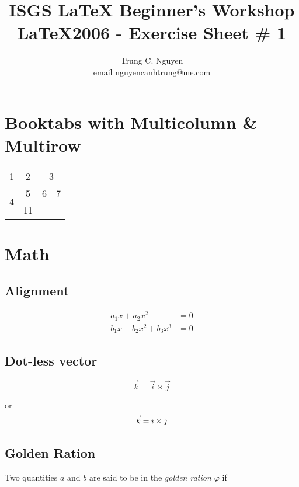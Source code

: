 \documentclass[a4paper, 10pt]{article}
\title{ISGS \LaTeX { }Beginner's Workshop 
	\\ \LaTeX 2006 - Exercise Sheet \# 1 }
\author{Trung C. Nguyen 
	\\ email \href{mailto:nguyencanhtrung@me.com}{nguyencanhtrung@me.com} }
\begin{document}
	\maketitle
	\tableofcontents
	
	\newpage
	
	\section{Booktabs with Multicolumn \& Multirow}
	\begin{tabular}{cccc}
		\toprule
		1 & 2 & \multicolumn{2}{c}{3} \\
		\multirow{2}{*}{4}& 5 & 6 & 7 \\
		10 & 11 & & \\
		
	\end{tabular}

	\section{Math}
	\subsection{Alignment}
	
	\begin{align}
		a_1x + a_2x^2 &= 0 \\
		b_1x +b_2x^2 + b_3x^3 &= 0
	\end{align}

	\subsection{Dot-less vector}
		$$\vec{k} = \vec{i} \times \vec{j} $$
		
		or
		\begin{align}
		\vec{k} = \imath \times \jmath \notag
		\end{align}
	\subsection{Golden Ration}
	Two quantities $a$ and $b$ are said to be in the \emph{golden ration $\varphi$}  if
	
\end{document}
